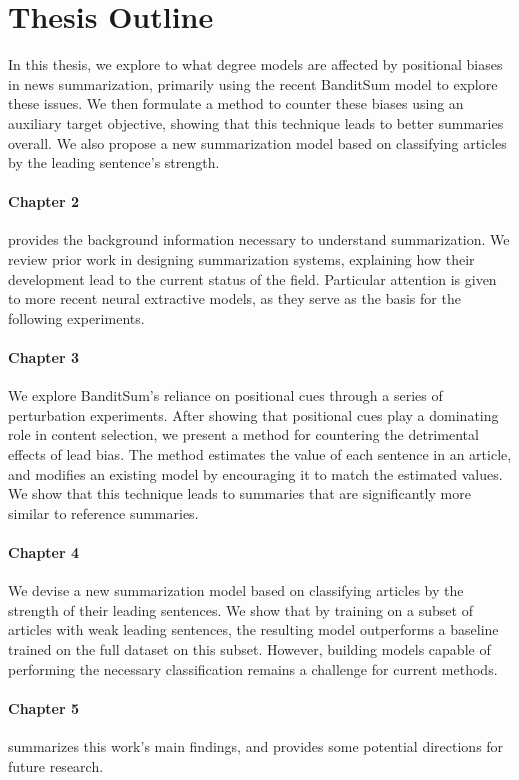 \section{Thesis Outline}
In this thesis, we explore to what degree models are affected by positional biases in news summarization, primarily using the recent BanditSum model \parencite{dong2018banditsum} to explore these issues. We then formulate a method to counter these biases using an auxiliary target objective, showing that this technique leads to better summaries overall. We also propose a new summarization model based on classifying articles by the leading sentence's strength.
\paragraph{Chapter 2} provides the background information necessary to understand summarization. We review prior work in designing summarization systems, explaining how their development lead to the current status of the field. Particular attention is given to more recent neural extractive models, as they serve as the basis for the following experiments.
\paragraph{Chapter 3} We explore BanditSum's reliance on positional cues through a series of perturbation experiments. After showing that positional cues play a dominating role in content selection, we present a method for countering the detrimental effects of lead bias. The method estimates the value of each sentence in an article, and modifies an existing model by encouraging it to match the estimated values. We show that this technique leads to summaries that are significantly more similar to reference summaries.
\paragraph{Chapter 4} We devise a new summarization model based on classifying articles by the strength of their leading sentences. We show that by training on a subset of articles with weak leading sentences, the resulting model outperforms a baseline trained on the full dataset on this subset.
However, building models capable of performing the necessary classification remains a challenge for current methods.
\paragraph{Chapter 5} summarizes this work's main findings, and provides some potential directions for future research.

